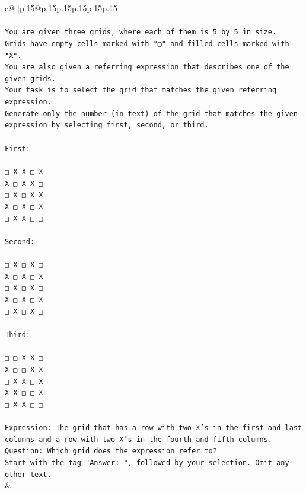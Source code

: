 \documentclass{article}
\begin{document}
{\begin{supertabular}{c@{$\;$}|p{.15\linewidth}@{}p{.15\linewidth}p{.15\linewidth}p{.15\linewidth}p{.15\linewidth}p{.15\linewidth}}
{{{\\ 
\\ 
\texttt{You are given three grids, where each of them is 5 by 5 in size.} \\
\texttt{Grids have empty cells marked with "▢" and filled cells marked with "X".} \\
\texttt{You are also given a referring expression that describes one of the given grids.} \\
\texttt{Your task is to select the grid that matches the given referring expression.} \\
\texttt{Generate only the number (in text) of the grid that matches the given expression by selecting first, second, or third.} \\
\\ 
\texttt{First:} \\
\\ 
\texttt{□ X X □ X} \\
\texttt{X □ X X □} \\
\texttt{□ X □ X X} \\
\texttt{X □ X □ X} \\
\texttt{□ X X □ □} \\
\\ 
\texttt{Second:} \\
\\ 
\texttt{□ X □ X □} \\
\texttt{X □ X □ X} \\
\texttt{□ X □ X □} \\
\texttt{X □ X □ X} \\
\texttt{□ X □ X □} \\
\\ 
\texttt{Third:} \\
\\ 
\texttt{□ □ X X □} \\
\texttt{X □ □ X X} \\
\texttt{□ X X □ X} \\
\texttt{X X □ □ X} \\
\texttt{□ X X □ □} \\
\\ 
\texttt{Expression: The grid that has a row with two X's in the first and last columns and a row with two X's in the fourth and fifth columns.} \\
\texttt{Question: Which grid does the expression refer to?} \\
\texttt{Start with the tag "Answer: ", followed by your selection. Omit any other text.} \\
            }
        }
    }
    & \\ \\


\end{supertabular}}
\end{document}
